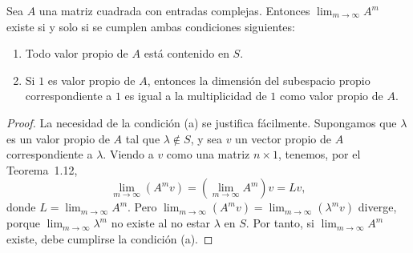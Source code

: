 \documentclass[12pt,a4paper]{book}
\begin{document}
    \begin{teorema}
        Sea $A$ una matriz cuadrada con entradas complejas. Entonces $\lim_{m\to\infty}A^m$ existe si y solo si se cumplen ambas condiciones siguientes:
        \begin{enumerate}[label=(\alph*)]
            \item Todo valor propio de $A$ está contenido en $S$.
            \item Si $1$ es valor propio de $A$, entonces la dimensión del subespacio propio correspondiente a $1$ es igual a la multiplicidad de $1$ como valor propio de $A$.
        \end{enumerate}
    \end{teorema}

    \begin{proof}
        La necesidad de la condición (a) se justifica fácilmente. Supongamos que $\lambda$ es un valor propio de $A$ tal que $\lambda\notin S$, y sea $v$ un vector propio de $A$ correspondiente a $\lambda$. Viendo a $v$ como una matriz $n\times 1$, tenemos, por el Teorema~1.12,
        \begin{equation*}
            \lim_{m\to\infty}(A^mv)=\left(\lim_{m\to\infty}A^m\right)v=Lv,
        \end{equation*}
        donde $L=\lim_{m\to\infty}A^m$. Pero $\lim_{m\to\infty}(A^mv)=\lim_{m\to\infty}(\lambda^mv)$ diverge, porque $\lim_{m\to\infty}\lambda^m$ no existe al no estar $\lambda$ en $S$. Por tanto, si $\lim_{m\to\infty}A^m$ existe, debe cumplirse la condición (a).


\end{proof}
\end{document}

